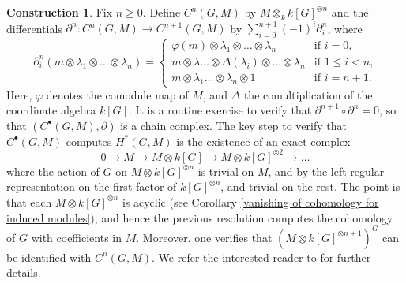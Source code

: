 \documentclass{article}
\theoremstyle{plain}
\theoremstyle{definition}
\newtheorem{construction}[Th]{Construction}
\begin{document}
\begin{construction}
    Fix $n\geq0$. Define $C^n(G,M)$ by $M\otimes_k k[G]^{\otimes n} $ and the differentials $\partial^n\colon C^n(G,M)\to C^{n+1}(G,M)$  by $\sum_{i=0}^{n+1} (-1)^i \partial^n_i $, where 
 \[
 \partial^n_i(m\otimes \lambda_1\otimes\ldots \otimes \lambda_n) = \left\{
        \begin{array}{ll}
            \varphi(m)\otimes \lambda_1\otimes\ldots\otimes \lambda_n & \textrm{if $i=0$,} \\
            m\otimes \lambda\ldots\otimes \Delta(\lambda_i)\otimes\ldots\otimes\lambda_n & \textrm{if $1\leq i<n$,}\\
            m\otimes\lambda_1\ldots\otimes\lambda_n\otimes 1 & \textrm{if $i=n+1.$}
        \end{array}
    \right.
 \]
Here, $\varphi$ denotes the comodule map of $M$, and $\Delta$ the comultiplication of the coordinate algebra $k[G]$. It is a routine exercise to verify that $\partial^{n+1}\circ\partial^{n}=0$, so that $(C^\bullet(G,M),\partial)$ is a chain complex. The key step to verify that $C^\bullet(G,M)$ computes $H^\ast(G,M)$ is the existence of an exact complex 
\[
0\to M \to M\otimes k[G]\to M\otimes k[G]^{\otimes 2} \to \ldots
\]
where the action of $G$ on $M\otimes k[G]^{\otimes n}$ is trivial on $M$, and by the left regular representation on the first factor of $k[G]^{\otimes n}$, and trivial on the rest. The point is that each $M\otimes k[G]^{\otimes n}$ is acyclic (see Corollary \ref{vanishing of cohomology for induced modules}), and hence the previous resolution computes the cohomology of $G$ with coefficients in $M$. Moreover, one verifies that $(M\otimes k[G]^{\otimes n+1})^G$ can be identified with $C^n(G,M)$. We refer the interested reader to \cite[Section I.4.15]{jantzen2003representations} for further details.
\end{construction}
\end{document}
